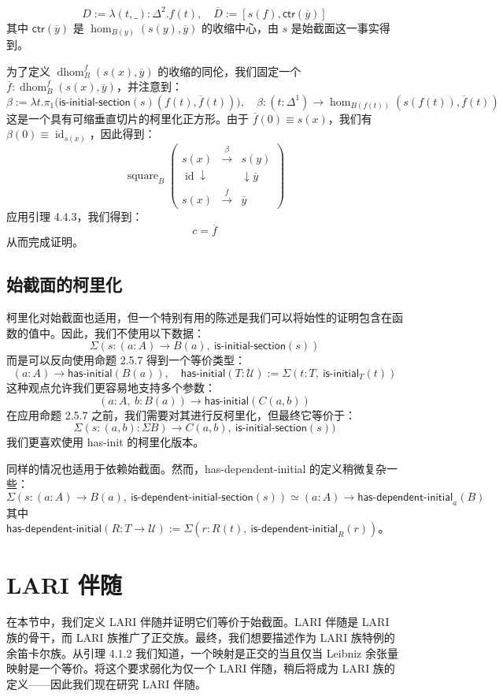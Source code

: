 \documentclass{ctexrep}
\theoremstyle{plain}
\theoremstyle{definition}
\theoremstyle{remark}
\theoremstyle{definition}
\theoremstyle{definition}
\theoremstyle{definition}
\newcommand{\coloneqq}{\mathrel{:=}}
\newcommand{\id}{\operatorname{id}}
\newcommand{\UU}{\mathcal{U}}
\newcommand{\dhom}{\operatorname{dhom}}
\newcommand{\square}{\operatorname{square}}
\newcommand{\isinitial}{\mathsf{is\text{-}initial}}
\newcommand{\isinitialsection}{\mathsf{is\text{-}initial\text{-}section}}
\newcommand{\isdepinitialsection}{\mathsf{is\text{-}dependent\text{-}initial\text{-}section}}
\newcommand{\isdepinitial}{\mathsf{is\text{-}dependent\text{-}initial}}
\newcommand{\ctr}{\mathsf{ctr}}
\newcommand{\hasinit}{\mathsf{has\text{-}initial}}
\newcommand{\hasdepinit}{\mathsf{has\text{-}dependent\text{-}initial}}
\begin{document}
\[
D \coloneqq \lambda (t,\_):\Delta^2. f(t), \quad \overline{D} \coloneqq [s(f), \ctr(\overline{y})]
\]
其中 $\ctr(\overline{y})$ 是 $\hom_{B(y)}(s(y),\overline{y})$ 的收缩中心，由 $s$ 是始截面这一事实得到。

为了定义 $\dhom_B^f(s(x),\overline{y})$ 的收缩的同伦，我们固定一个 $\overline{f}:\dhom_B^f(s(x),\overline{y})$，并注意到：
\[
\beta \coloneqq \lambda t.\pi_1\big(\isinitialsection(s)(f(t),\overline{f}(t))\big), \quad \beta:(t:\Delta^1)\to \hom_{B(f(t))}(s(f(t)),\overline{f}(t))
\]
这是一个具有可缩垂直切片的柯里化正方形。由于 $\overline{f}(0) \equiv s(x)$，我们有 $\beta(0) \equiv \id_{s(x)}$，因此得到：
\[
\square_B\left(\begin{array}{ccc}
s(x) & \xrightarrow{\beta} & s(y) \\
\id\downarrow & & \downarrow \overline{y} \\
s(x) & \xrightarrow{\overline{f}} & \overline{y}
\end{array}\right)
\]
应用引理 4.4.3，我们得到：
\[
c = \overline{f}
\]
从而完成证明。

\subsection{始截面的柯里化}

柯里化对始截面也适用，但一个特别有用的陈述是我们可以将始性的证明包含在函数的值中。因此，我们不使用以下数据：
\[
\Sigma(s:(a:A)\to B(a),\ \isinitialsection(s))
\]
而是可以反向使用命题 2.5.7 得到一个等价类型：
\[
(a:A) \to \hasinit(B(a)), \quad \hasinit(T:\UU) \coloneqq \Sigma(t:T,\ \isinitial_T(t))
\]
这种观点允许我们更容易地支持多个参数：
\[
(a:A,\ b:B(a)) \to \hasinit(C(a,b))
\]
在应用命题 2.5.7 之前，我们需要对其进行反柯里化，但最终它等价于：
\[
\Sigma(s:(a,b):\Sigma B) \to C(a,b),\ \isinitialsection(s))
\]
我们更喜欢使用 has-init 的柯里化版本。

同样的情况也适用于依赖始截面。然而，has-dependent-initial 的定义稍微复杂一些：
\[
\Sigma(s:(a:A)\to B(a),\ \isdepinitialsection(s)) \simeq (a:A) \to \hasdepinit_a(B)
\]
其中 $\hasdepinit(R:T\to\UU) \coloneqq \Sigma(r:R(t),\ \isdepinitial_R(r))$。

\section{LARI 伴随}

在本节中，我们定义 LARI 伴随并证明它们等价于始截面。LARI 伴随是 LARI 族的骨干，而 LARI 族推广了正交族。最终，我们想要描述作为 LARI 族特例的余笛卡尔族。从引理 4.1.2 我们知道，一个映射是正交的当且仅当 Leibniz 余张量映射是一个等价。将这个要求弱化为仅一个 LARI 伴随，稍后将成为 LARI 族的定义——因此我们现在研究 LARI 伴随。
\end{document}
